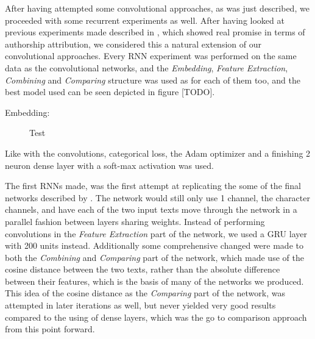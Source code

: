 After having attempted some convolutional approaches, as was just described,
we proceeded with some recurrent experiments as well. After having looked at
previous experiments made described in \cite{qian:2018}, which showed real
promise in terms of authorship attribution, we considered this a natural
extension of our convolutional approaches. Every \gls{RNN} experiment
was performed on the same data as the convolutional networks, and the
\textit{Embedding}, \textit{Feature Extraction}, \textit{Combining} and
\textit{Comparing} structure was used as for each of them too, and the best
model used can be seen depicted in figure [TODO].

\begin{description}

    \item[Embedding:] Test

\end{description}








 Like with the
convolutions, categorical loss, the Adam optimizer and a finishing 2 neuron
dense layer with a soft-max activation was used.

The first \gls{RNN}s made, was the first attempt at replicating the some of
the final networks described by \cite{qian:2018}. The network would still only
use 1 channel, the character channels, and have each of the two input texts
move through the network in a parallel fashion between layers sharing weights.
Instead of performing convolutions in the \textit{Feature Extraction} part of
the network, we used a \gls{GRU} layer with 200 units instead. Additionally
some comprehensive changed were made to both the \textit{Combining} and
\textit{Comparing} part of the network, which made use of the cosine distance
between the two texts, rather than the absolute difference between their
features, which is the basis of many of the networks we produced. This idea of
the cosine distance as the \textit{Comparing} part of the network, was attempted
in later iterations as well, but never yielded very good results compared to the
using of dense layers, which was the go to comparison approach from this point
forward.

